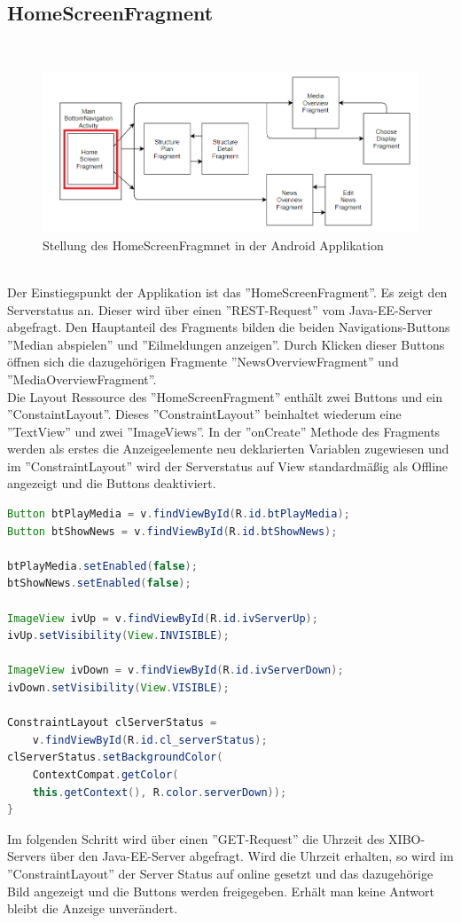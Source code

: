 \subsection{HomeScreenFragment}
\\
\begin{figure}[H]
\centering
\includegraphics[width=1.0\textwidth]{images/06_AndroidApp/06_AndroidArchHomeScreen}
\caption{Stellung des HomeScreenFragmnet in der Android Applikation}
\label{fig:mediaNav}
\end{figure}
\\
Der Einstiegspunkt der Applikation ist das ''HomeScreenFragment''. Es zeigt den Serverstatus an. Dieser wird über einen ''REST-Request'' vom Java-EE-Server abgefragt. Den Hauptanteil des Fragments bilden die beiden Navigations-Buttons ''Median abspielen'' und ''Eilmeldungen anzeigen''. Durch Klicken dieser Buttons öffnen sich die dazugehörigen Fragmente ''NewsOverviewFragment'' und ''MediaOverviewFragment''.
\\
Die Layout Ressource des ''HomeScreenFragment'' enthält zwei Buttons und ein ''ConstaintLayout''. Dieses ''ConstraintLayout'' beinhaltet wiederum eine ''TextView'' und zwei ''ImageViews''. In der ''onCreate'' Methode des Fragments werden als erstes die Anzeigeelemente neu deklarierten Variablen zugewiesen und im ''ConstraintLayout'' wird der Serverstatus auf View standardmäßig als Offline angezeigt und die Buttons deaktiviert.
\begin{lstlisting}[language=Java,caption={Initialisieren der Variablen im HomeScreenFragment }]
Button btPlayMedia = v.findViewById(R.id.btPlayMedia);
Button btShowNews = v.findViewById(R.id.btShowNews);

btPlayMedia.setEnabled(false);
btShowNews.setEnabled(false);
    
ImageView ivUp = v.findViewById(R.id.ivServerUp);
ivUp.setVisibility(View.INVISIBLE);
    
ImageView ivDown = v.findViewById(R.id.ivServerDown);    
ivDown.setVisibility(View.VISIBLE);
    
ConstraintLayout clServerStatus = 
    v.findViewById(R.id.cl_serverStatus);
clServerStatus.setBackgroundColor(
    ContextCompat.getColor(
    this.getContext(), R.color.serverDown));
}
\end{lstlisting}
Im folgenden Schritt wird über einen ''GET-Request'' die Uhrzeit des XIBO-Servers über den Java-EE-Server abgefragt. Wird die Uhrzeit erhalten, so wird im ''ConstraintLayout'' der Server Status auf online gesetzt und das dazugehörige Bild angezeigt und die Buttons werden freigegeben. Erhält man keine Antwort bleibt die Anzeige unverändert.


